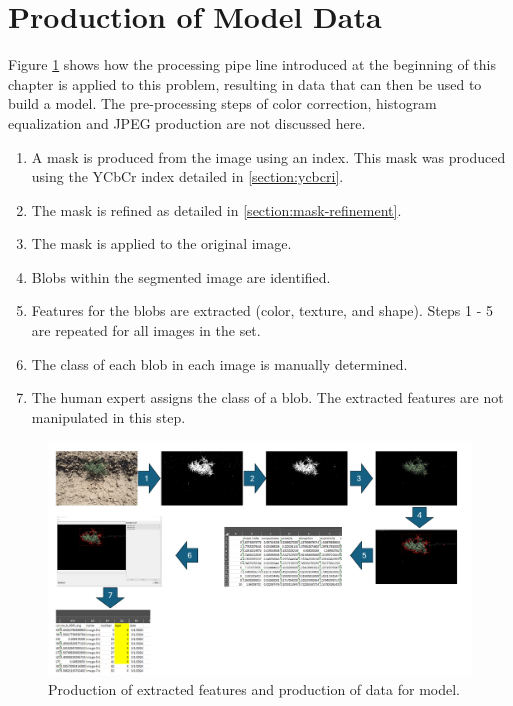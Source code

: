 \documentclass[letterpaper, notitlepage]{report}
\begin{document}
\section{Production of Model Data}
Figure \ref{fig:workflow-for-model-data} shows how the processing pipe line introduced at the beginning of this chapter is applied to this problem, resulting in data that can then be used to build a model. The pre-processing steps of color correction, histogram equalization and JPEG production are not discussed here. 
\begin{enumerate}
	\item{A mask is produced from the image using an index. This mask was produced using the YCbCr index detailed in \ref{section:ycbcri}.}
	\item{The mask is refined as detailed in \ref{section:mask-refinement}.}
	\item{The mask is applied to the original image.}
	\item{Blobs within the segmented image are identified.}
	\item{Features for the blobs are extracted (color, texture, and shape). Steps 1 - 5 are repeated for all images in the set.}
	\item{The class of each blob in each image is manually determined.}
	\item{The human expert assigns the class of a blob. The extracted features are not manipulated in this step.}
\end{enumerate}

\begin{figure}[H]
	\centering
	\includegraphics[width=\linewidth]{./figures/workflow-for-image.png}
	\caption[Production of extracted features]{Production of extracted features and production of data for model.}
	\label{fig:workflow-for-model-data}
\end{figure}
\end{document}
